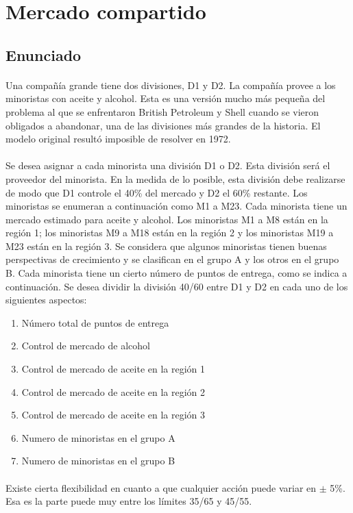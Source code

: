 \section{Mercado compartido}
\subsection{Enunciado}
\paragraph{} Una compañía grande tiene dos divisiones, D1 y D2. La compañía provee a los minoristas con aceite y alcohol. Esta es una versión mucho más pequeña del problema al que se enfrentaron British Petroleum y Shell cuando se vieron obligados a abandonar, una de las divisiones más grandes de la historia. El modelo original resultó imposible de resolver en 1972.
\paragraph{} Se desea asignar a cada minorista una división D1 o D2. Esta división será el proveedor del minorista. En la medida de lo posible, esta división debe realizarse de modo que D1 controle el 40\% del mercado y D2 el 60\% restante. Los minoristas se enumeran a continuación como M1 a M23. Cada minorista tiene un mercado estimado para aceite y alcohol. Los minoristas M1 a M8 están en la región 1; los minoristas M9 a M18 están en la región 2 y los minoristas M19 a M23 están en la región 3. Se considera que algunos minoristas tienen buenas perspectivas de crecimiento y se clasifican en el grupo A y los otros en el grupo B. Cada minorista tiene un cierto número de puntos de entrega, como se indica a continuación. Se desea dividir la división 40/60 entre D1 y D2 en cada uno de los siguientes aspectos:
\begin{enumerate}
\item Número total de puntos de entrega
\item Control de mercado de alcohol
\item Control de mercado de aceite en la región 1
\item Control de mercado de aceite en la región 2
\item Control de mercado de aceite en la región 3
\item Numero de minoristas en el grupo A
\item Numero de minoristas en el grupo B
\end{enumerate}
\paragraph{} Existe cierta flexibilidad en cuanto a que cualquier acción puede variar en $\pm$ 5\%. Esa es la parte puede muy entre los límites 35/65 y 45/55.
